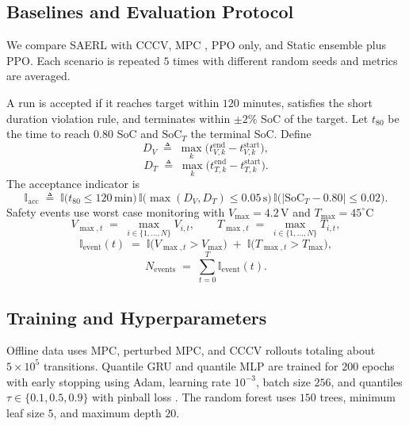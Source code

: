 \documentclass[%
 aip,
 amsmath,amssymb,
reprint, onecolumn %
]{revtex4-1}
\begin{document}
\subsection{Baselines and Evaluation Protocol}
\label{subsec:baselines_protocol}
We compare SAERL with CCCV, MPC \cite{yan2020mpc}, PPO only, and Static ensemble plus PPO. Each scenario is repeated $5$ times with different random seeds and metrics are averaged.

A run is accepted if it reaches target within $120$ minutes, satisfies the short duration violation rule, and terminates within $\pm 2\%$ SoC of the target. Let $t_{80}$ be the time to reach $0.80$ SoC and $\mathrm{SoC}_T$ the terminal SoC. Define
\begin{equation}
D_V \;\triangleq\; \max_k \big( t^{\mathrm{end}}_{V,k} - t^{\mathrm{start}}_{V,k} \big),
\end{equation}
\begin{equation}
D_T \;\triangleq\; \max_k \big( t^{\mathrm{end}}_{T,k} - t^{\mathrm{start}}_{T,k} \big).
\end{equation}
The acceptance indicator is
\begin{equation}
\mathbb{I}_{\mathrm{acc}}
\;\triangleq\;
\mathbb{I}\!\big(t_{80} \le 120\,\mathrm{min}\big)\,
\mathbb{I}\!\big(\max(D_V,D_T) \le 0.05\,\mathrm{s}\big)\,
\mathbb{I}\!\big(|\mathrm{SoC}_T - 0.80| \le 0.02\big).
\end{equation}
Safety events use worst case monitoring with $V_{\max}=4.2\,\mathrm{V}$ and $T_{\max}=45^\circ\mathrm{C}$
\begin{equation}
V_{\max,t} \;=\; \max_{i \in \{1,\dots,N\}} V_{i,t},
\qquad
T_{\max,t} \;=\; \max_{i \in \{1,\dots,N\}} T_{i,t},
\end{equation}
\begin{equation}
\mathbb{I}_{\mathrm{event}}(t)
\;=\;
\mathbb{I}\!\big(V_{\max,t} > V_{\max}\big) \;+\; \mathbb{I}\!\big(T_{\max,t} > T_{\max}\big),
\end{equation}
\begin{equation}
N_{\mathrm{events}} \;=\; \sum_{t=0}^{T} \mathbb{I}_{\mathrm{event}}(t).
\end{equation}

\subsection{Training and Hyperparameters}
\label{subsec:training_hparams}
Offline data uses MPC, perturbed MPC, and CCCV rollouts totaling about $5 \times 10^5$ transitions. Quantile GRU and quantile MLP are trained for $200$ epochs with early stopping using Adam, learning rate $10^{-3}$, batch size $256$, and quantiles $\tau \in \{0.1,0.5,0.9\}$ with pinball loss \cite{koenker2001quantile}. The random forest uses $150$ trees, minimum leaf size $5$, and maximum depth $20$.
\end{document}
